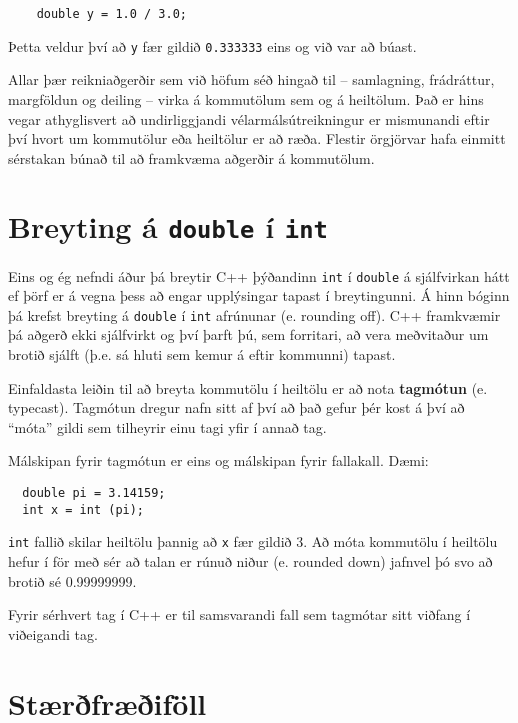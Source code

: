 \begin{verbatim}
    double y = 1.0 / 3.0;
\end{verbatim}
%
Þetta veldur því að {\tt y} fær gildið {\tt 0.333333} eins og við var að búast.


Allar þær reikniaðgerðir sem við höfum séð hingað til -- samlagning, frádráttur, margföldun og deiling -- virka á kommutölum sem og á heiltölum.
Það er hins vegar athyglisvert að undirliggjandi vélarmálsútreikningur er mismunandi eftir því hvort um kommutölur eða heiltölur er að ræða.
Flestir örgjörvar hafa einmitt sérstakan búnað til að framkvæma aðgerðir á kommutölum.

\section{Breyting á {\tt double} í {\tt int}}
\label{rounding}

Eins og ég nefndi áður þá breytir C++ þýðandinn {\tt int}
í {\tt double} á sjálfvirkan hátt ef þörf er á vegna þess að engar upplýsingar tapast í breytingunni.
Á hinn bóginn þá krefst breyting á {\tt double} í {\tt int} afrúnunar (e. rounding off).
C++ framkvæmir þá aðgerð ekki sjálfvirkt og því þarft þú, sem forritari, að vera meðvitaður um brotið sjálft (þ.e. sá hluti sem kemur á eftir kommunni) tapast.

Einfaldasta leiðin til að breyta kommutölu í heiltölu er að nota {\bf tagmótun} (e. typecast).
Tagmótun dregur nafn sitt af því að það gefur þér kost á því að ``móta'' gildi sem tilheyrir einu tagi yfir í annað tag.

Málskipan fyrir tagmótun er eins og málskipan fyrir fallakall.
Dæmi:

\begin{verbatim}
  double pi = 3.14159;
  int x = int (pi);
\end{verbatim}
%
{\tt int} fallið skilar heiltölu þannig að {\tt x} fær gildið 3.
Að móta kommutölu í heiltölu hefur í för með sér að talan er rúnuð niður (e. rounded down) jafnvel þó svo að brotið sé 0.99999999.

Fyrir sérhvert tag í C++ er til samsvarandi fall sem tagmótar sitt viðfang í viðeigandi tag.

\section{Stærðfræðiföll}

